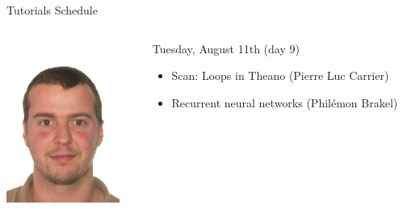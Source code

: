 \documentclass[a4paper,9pt]{beamer}
\begin{document}
\begin{frame}{Tutorials Schedule}
{\begin{columns}
\begin{column}{.07\textwidth}
          \includegraphics[width=\columnwidth]{philemon_brakel.jpg}
        \end{column}
        \begin{column}{.8\textwidth}
          \scriptsize
          Tuesday, August 11th (day 9)
          \begin{itemize}
            \item Scan: Loops in Theano (Pierre Luc Carrier)
            \item Recurrent neural networks (Philémon Brakel)
          \end{itemize}
          \vspace{2mm}
        \end{column}
      \end{columns}
    }


\end{frame}
\end{document}
